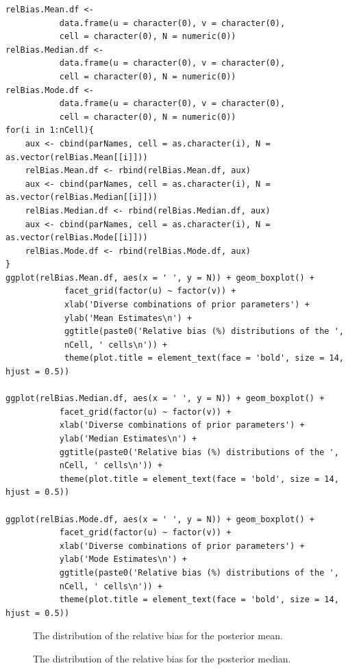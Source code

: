 \documentclass[12pt, a4paper]{article}
\begin{document}
\begin{verbatim}
relBias.Mean.df <- 
           data.frame(u = character(0), v = character(0), 
           cell = character(0), N = numeric(0))
relBias.Median.df <- 
           data.frame(u = character(0), v = character(0), 
           cell = character(0), N = numeric(0))
relBias.Mode.df <- 
           data.frame(u = character(0), v = character(0), 
           cell = character(0), N = numeric(0))
for(i in 1:nCell){
    aux <- cbind(parNames, cell = as.character(i), N = as.vector(relBias.Mean[[i]]))
    relBias.Mean.df <- rbind(relBias.Mean.df, aux)
    aux <- cbind(parNames, cell = as.character(i), N = as.vector(relBias.Median[[i]]))
    relBias.Median.df <- rbind(relBias.Median.df, aux)
    aux <- cbind(parNames, cell = as.character(i), N = as.vector(relBias.Mode[[i]]))
    relBias.Mode.df <- rbind(relBias.Mode.df, aux)
}
ggplot(relBias.Mean.df, aes(x = ' ', y = N)) + geom_boxplot() +
            facet_grid(factor(u) ~ factor(v)) + 
            xlab('Diverse combinations of prior parameters') + 
            ylab('Mean Estimates\n') +
            ggtitle(paste0('Relative bias (%) distributions of the ', 
            nCell, ' cells\n')) +
            theme(plot.title = element_text(face = 'bold', size = 14, hjust = 0.5))

ggplot(relBias.Median.df, aes(x = ' ', y = N)) + geom_boxplot() +
           facet_grid(factor(u) ~ factor(v)) +
           xlab('Diverse combinations of prior parameters') + 
           ylab('Median Estimates\n') +
           ggtitle(paste0('Relative bias (%) distributions of the ', 
           nCell, ' cells\n')) +
           theme(plot.title = element_text(face = 'bold', size = 14, hjust = 0.5))

ggplot(relBias.Mode.df, aes(x = ' ', y = N)) + geom_boxplot() +
           facet_grid(factor(u) ~ factor(v)) +
           xlab('Diverse combinations of prior parameters') + 
           ylab('Mode Estimates\n') +
           ggtitle(paste0('Relative bias (%) distributions of the ', 
           nCell, ' cells\n')) +
           theme(plot.title = element_text(face = 'bold', size = 14, hjust = 0.5))
\end{verbatim}


\begin{figure}
\centering
\caption{The distribution of the relative bias for the posterior mean.}
\label{manycellsmean} 	
\end{figure}

\begin{figure}
\centering
\caption{The distribution of the relative bias for the posterior median.}
\label{manycellsmedian} 	
\end{figure}
\end{document}
